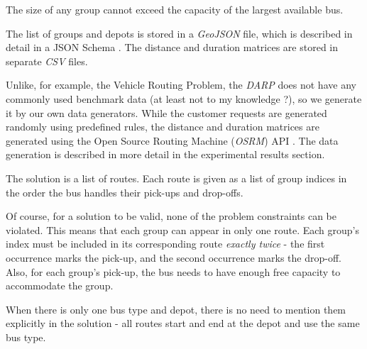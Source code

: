 The size of any group cannot exceed the capacity of the largest available bus.

The list of groups and depots is stored in a \textit{GeoJSON} file, which is described in detail in a JSON Schema . The distance and duration matrices are stored in separate \textit{CSV} files.

Unlike, for example, the Vehicle Routing Problem, the \textit{DARP} does not have any commonly used benchmark data (at least not to my knowledge ?), so we generate it by our own data generators. While the customer requests are generated randomly using predefined rules, the distance and duration matrices are generated using the Open Source Routing Machine (\textit{OSRM}) API \cite{luxen-vetter-2011}. The data generation is described in more detail in the experimental results section. 


The solution is a list of routes. Each route is given as a list of group indices in the order the bus handles their pick-ups and drop-offs.

Of course, for a solution to be valid, none of the problem constraints can be violated. This means that each group can appear in only one route. Each group's index must be included in its corresponding route \textit{exactly twice} - the first occurrence marks the pick-up, and the second occurrence marks the drop-off. Also, for each group's pick-up, the bus needs to have enough free capacity to accommodate the group.

When there is only one bus type and depot, there is no need to mention them explicitly in the solution - all routes start and end at the depot and use the same bus type.
